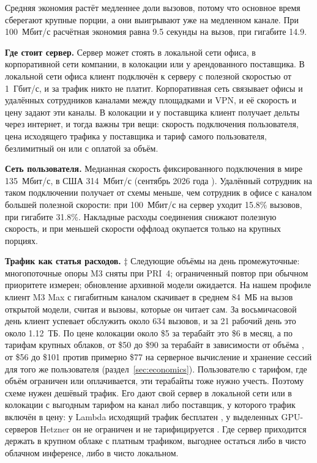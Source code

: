 Средняя экономия растёт медленнее доли вызовов, потому что основное время сберегают крупные порции, а они выигрывают
уже на медленном канале. При 100~Мбит/с расчётная экономия равна 9.5 секунды на вызов, при гигабите 14.9.

\textbf{Где стоит сервер.} Сервер может стоять в локальной сети офиса, в корпоративной сети компании, в колокации
или у арендованного поставщика. В локальной сети офиса клиент подключён к серверу с полезной скоростью от 1~Гбит/с, и за
трафик никто не платит. Корпоративная сеть связывает офисы и удалённых сотрудников каналами между площадками и VPN, и
её скорость и цену задают эти каналы. В колокации и у поставщика клиент получает дельты через интернет, и тогда важны
три вещи: скорость подключения пользователя, цена исходящего трафика у поставщика и тариф самого пользователя,
безлимитный он или с оплатой за объём.

\textbf{Сеть пользователя.} Медианная скорость фиксированного подключения в мире 135~Мбит/с, в США 314~Мбит/с
(сентябрь 2026 года \cite{ookla2026}). Удалённый сотрудник на таком подключении получает от схемы меньше, чем сотрудник в
офисе с каналом большей полезной скорости: при 100~Мбит/с на сервер уходит 15.8\% вызовов, при гигабите 31.8\%. Накладные расходы соединения снижают полезную скорость, и при меньшей скорости оффлоад окупается только на крупных порциях.

\textbf{Трафик как статья расходов.} ‡ Следующие объёмы на день промежуточные: многопоточные опоры M3 сняты при PRI~4; ограниченный повтор при обычном приоритете измерен; обновление архивной модели ожидается. На нашем профиле клиент M3 Max с гигабитным каналом скачивает в среднем
84~МБ на вызов открытой модели, считая и вызовы, которые он читает сам. За восьмичасовой день клиент успевает обслужить около 634 вызовов, и за 21 рабочий день это около 1.12~ТБ. По цене колокации около \$5 за терабайт это \$6 в месяц, а
по тарифам крупных облаков, от \$50 до \$90 за терабайт в зависимости от объёма \cite{awsdatatransfer}, от \$56 до \$101 против примерно \$77 на серверное вычисление и хранение сессий для того же пользователя
(раздел~\ref{sec:economics}).
Пользователю с тарифом, где объём ограничен или оплачивается, эти терабайты тоже нужно учесть.
Поэтому схеме нужен дешёвый трафик. Его дают свой сервер в локальной сети или в колокации с
выгодным тарифом на канал либо поставщик, у которого трафик включён в цену: у Lambda исходящий трафик бесплатен
\cite{lambdapricing}, у выделенных GPU-серверов Hetzner он не ограничен и не тарифицируется \cite{hetznergpu}. Где
сервер приходится держать в крупном облаке с платным трафиком, выгоднее остаться либо в чисто облачном
инференсе, либо в чисто локальном.

